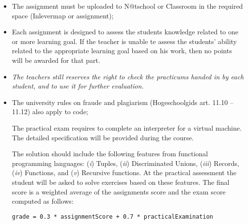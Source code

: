 \begin{itemize}
  \item The assignment must be uploaded to N@tschool or Classroom in the required space (Inlevermap or assignment);
  \item Each assignment is designed to assess the students knowledge related to one or more learning goal.
          If the teacher is unable te assess the students' ability related to the appropriate learning goal based on his work, then no points will be awarded for that part.
  \item \textit{The teachers still reserves the right to check the practicums handed in by each student, and to use it for further evaluation.}
  \item The university rules on fraude and plagiarism (Hogeschoolgids art. 11.10 -- 11.12) also apply to code;
  
The practical exam requires to complete an interpreter for a virtual machine. The detailed specification will be provided during the course.

The solution should include the following features from functional programming languages: (\textit{i}) Tuples, (\textit{ii}) Discriminated Unions, 
(\textit{iii}) Records, (\textit{iv}) Functions, and (\textit{v}) Recursive functions. At the practical assessment the student will be asked to solve exercises based on these features. The final score is a weighted average of the assignments score and the exam score computed as follows:

\texttt{grade = 0.3 * assignmentScore + 0.7 * practicalExamination}

\end{itemize}
